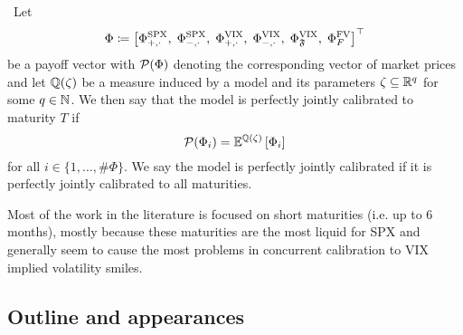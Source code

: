 \begin{definition}\label{def:perfectcalibration}\
Let 
$$\Phi \coloneqq \left[\Phi_{+,\cdot}^{\mathrm{SPX}},\; \Phi_{-,\cdot}^{\mathrm{SPX}},\; \Phi_{+,\cdot}^{\mathrm{VIX}},\; \Phi_{-,\cdot}^{\mathrm{VIX}},\; \Phi_{\mathfrak{F}}^{\mathrm{VIX}},\; \Phi^\textup{FV}_F \right]^\top$$
be a payoff vector with $\mathcal{P}(\Phi)$ denoting the corresponding vector of market prices and let $\mathbb{Q}(\zeta)$ be a measure induced by a model and its parameters $\zeta\subseteq\mathbb{R}^q$ for some $q\in\mathbb{N}$. We then say that the model is perfectly jointly calibrated to maturity $T$ if
\[
\mathcal{P}(\Phi_i) = \mathbb{E}^{\mathbb{Q}(\zeta)}\left[\Phi_i\right]
\]
for all $i\in\{1,\dots,\#\Phi\}$. We say the model is perfectly jointly calibrated if it is perfectly jointly calibrated to all maturities.
\end{definition}

Most of the work in the literature is focused on short maturities (i.e. up to 6 months), mostly because these maturities are the most liquid for SPX and generally seem to cause the most problems in concurrent calibration to VIX implied volatility smiles.


\subsection{Outline and appearances}
